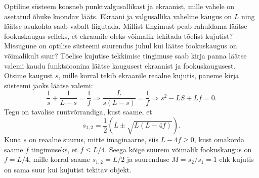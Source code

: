 
Optiline süsteem koosneb punktvalgusallikast ja ekraanist, mille vahele on asetatud õhuke koondav lääts. Ekraani ja valgusallika vaheline kaugus on $L$ ning läätse asukohta saab vabalt liigutada. Millist tingimust peab rahuldama läätse fookuskaugus selleks, et ekraanile oleks võimalik tekitada tõelist kujutist? Missugune on optilise süsteemi suurendus juhul kui läätse fookuskaugus on võimalikult suur?\hint
Tõelise kujutise tekkimise tingimuse saab kirja panna läätse valemi kaudu funktsioonina läätse kaugusest ekraanist ja fookuskaugusest.\solu
Otsime kaugust $s$, mille korral tekib ekraanile reaalne kujutis, paneme kirja süsteemi jaoks läätse valemi:
$$
\frac{1}{s}+\frac{1}{L-s}=\frac{1}{f}\Rightarrow \frac{L}{s(L-s)}=\frac{1}{f} \Rightarrow s^2-LS+Lf=0.
$$
Tegu on tavalise ruutvõrrandiga, kust saame, et
$$
s_{1,2}=\frac{1}{2}\left(L\pm\sqrt{L(L-4f)}\right).
$$
Kuna $s$ on reaalne suurus, mitte imaginaarne, siis $L-4f \geq 0$, kust omakorda saame $f$ tingimuseks, et $f \leq L/4$. Seega kõige suurem võimalik fookuskaugus on $f = L/4$, mille korral saame $s_{1,2} = L/2$ ja suurenduse $M=s_2/s_1 = 1$ ehk kujutis on sama suur kui kujutist tekitav objekt.\probend